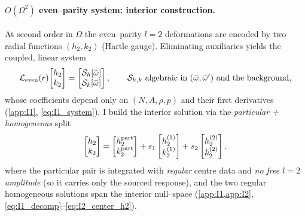 \documentclass{iopjournal}
\begin{document}
\paragraph{$O(\Omega^2)$ even–parity system: interior construction.}
At second order in \(\Omega\) the even–parity \(l=2\) deformations are encoded by two radial functions \((h_2,k_2)\) (Hartle gauge). Eliminating auxiliaries yields the coupled, linear system
\begin{equation}
\mathcal L_{\rm even}(r)\!\begin{bmatrix}h_2\\ k_2\end{bmatrix}
=\begin{bmatrix}\mathcal S_h[\bar\omega]\\ \mathcal S_k[\bar\omega]\end{bmatrix},\qquad
\mathcal S_{h,k}\ \hbox{algebraic in }(\bar\omega,\bar\omega')\ \hbox{and the background},
\label{eq:12_even_sys}
\end{equation}
whose coefficients depend only on \((N,A,\rho,p)\) and their first derivatives (\cref{app:I1}, \eqref{eq:I1_system}). I build the interior solution via the \emph{particular + homogeneous} split
\begin{equation}
\begin{bmatrix}h_2\\ k_2\end{bmatrix}
=\begin{bmatrix}h_2^{\rm part}\\ k_2^{\rm part}\end{bmatrix}
+s_1\begin{bmatrix}h_2^{(1)}\\ k_2^{(1)}\end{bmatrix}
+s_2\begin{bmatrix}h_2^{(2)}\\ k_2^{(2)}\end{bmatrix},
\label{eq:12_decomp}
\end{equation}
where the particular pair is integrated with \emph{regular} centre data and \emph{no free $l=2$ amplitude} (so it carries only the sourced response), and the two regular homogeneous solutions span the interior null–space (\cref{app:I1,app:I2}, \eqref{eq:I1_decomp}–\eqref{eq:I2_center_h2}).
\end{document}
